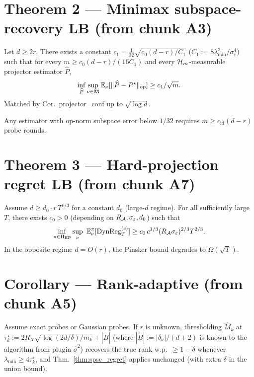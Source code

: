\section{Theorem 2 --- Minimax subspace-recovery LB (from chunk A3)}

\begin{theorem}
\label{thm:minimax}
Let $d\ge 2r$. There exists a constant $c_1=\tfrac{1}{32}\sqrt{c_0(d-r)/C_1}$
($C_1 := 8\lambda_{\min}^2/\sigma_\varepsilon^4$) such that for every
$m\ge c_0(d-r)/(16 C_1)$ and every $\mathcal{H}_m$-measurable projector
estimator $\widehat P$,
\[
\inf_{\widehat P}\sup_{\nu\in\mathfrak M}\mathbb{E}_\nu[\|\widehat P - P^\star\|_{\mathrm{op}}]
\ge c_1/\sqrt m.
\]
Matched by Cor.\ projector\_conf up to $\sqrt{\log d}$.
\end{theorem}

\begin{corollary}
\label{cor:id_threshold}
Any estimator with op-norm subspace error below $1/32$ requires
$m \ge c_{\mathrm{id}}(d-r)$ probe rounds.
\end{corollary}

\section{Theorem 3 --- Hard-projection regret LB (from chunk A7)}

\begin{theorem}
\label{thm:regret_lb}
Assume $d \ge d_0\cdot r\,T^{1/3}$ for a constant $d_0$ (large-$d$ regime).
For all sufficiently large $T$, there exists $c_0 > 0$ (depending on
$R_{\mathcal{A}}, \sigma_\varepsilon, d_0$) such that
\[
\inf_{\pi\in\Pi_{\mathrm{HP}}} \sup_\nu\ \E^\pi_\nu[\DynReg_T^{(c)}]
\ge c_0\,c^{1/3}(R_\cA\sigma_\varepsilon)^{2/3} T^{2/3}.
\]
In the opposite regime $d=O(r)$, the Pinsker bound degrades to $\Omega(\sqrt T)$.
\end{theorem}

\section{Corollary --- Rank-adaptive (from chunk A5)}

\begin{corollary}
\label{cor:rank_adaptive}
Assume exact probes or Gaussian probes. If $r$ is unknown, thresholding
$\widehat M_k$ at $\tau_k^\star := 2R_X\sqrt{\log(2d/\delta)/m_k}+|\widetilde B|$
(where $|\widetilde B|:=|\delta_\sigma|/(d+2)$ is known to the algorithm
from plugin $\hat\sigma^2$) recovers the true rank w.p.\ $\ge 1-\delta$
whenever $\lambda_{\min}\ge 4\tau_k^\star$, and Thm.\ \ref{thm:spsc_regret}
applies unchanged (with extra $\delta$ in the union bound).
\end{corollary}

